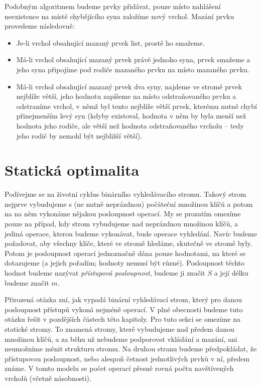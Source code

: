 Podobným algoritmem budeme prvky přidávat, pouze místo nahlášení neexistence na místě chybějícího syna založíme nový vrchol. Mazání prvku provedeme následovně:

\begin{itemize}
\item Je-li vrchol obsahující mazaný prvek list, prostě ho smažeme.
\item Má-li vrchol obsahující mazaný prvek právě jednoho syna, prvek smažeme a jeho syna připojíme pod rodiče mazaného prvku na místo mazaného prvku.
\item Má-li vrchol obsahující mazaný prvek dva syny, najdeme ve stromě prvek nejblíže větší, jeho
hodnotu zapíšeme na místo odstraňovaného prvku a odstraníme vrchol, v němž byl tento nejblíže větší
prvek, kterému nutně chybí přinejmenším levý syn (kdyby existoval, hodnota v
něm by byla menší než hodnota jeho rodiče, ale větší než hodnota odstraňovaného
vrcholu -- tedy jeho rodič by nemohl být nejbližší větší).  
\end{itemize} 

\section{Statická optimalita}

Podívejme se na životní cyklus binárního vyhledávacího stromu. Takový strom
nejprve vybudujeme s (ne nutně neprázdnou) počáteční množinou klíčů
a potom na na něm vykonáme nějakou posloupnost operací. My se prozatím omezíme
pouze na případ, kdy strom vybudujeme nad neprázdnou množinou klíčů, a jediná
operace, kterou budeme vykonávat, bude operace vyhledání. Navíc budeme
požadovat, aby všechny klíče, které ve stromě hledáme, skutečně ve stromě byly.
Potom je posloupnost operací jednoznačně dána pouze hodnotami, na které se
dotazujeme (a jejich pořadím; hodnoty nemusí být různé). Posloupnost těchto
hodnot budeme nazývat \emph{přístupová posloupnost}, budeme ji značit $S$ a
její délku budeme značit $m$.

Přirozená otázka zní, jak vypadá binární vyhledávací strom, který pro danou
posloupnost přístupů vykoná nejméně operací. V plné obecnosti budeme tuto otázku řešit v pozdějších částech této kapitoly. Pro tuto sekci se omezíme na statické
stromy. To znamená stromy, které vybudujeme nad předem danou množinou klíčů, a
za běhu už nebudeme podporovat vkládání a mazání, ani neumožníme měnit
strukturu stromu. Na druhou stranu budeme předpokládat, že přístupovou posloupnost, nebo alespoň četnost jednotlivých prvků v ní, předem známe. V tomto modelu se počet operací přesně rovná
počtu navštívených vrcholů (včetně násobnosti).

